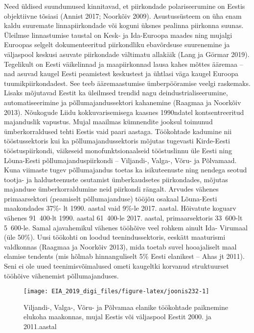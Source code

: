 \documentclass[]{book}
\begin{document}
Need üldised suundumused kinnitavad, et piirkondade polariseerumine on Eestis objektiivne tõsiasi (Annist
2017; Noorkõiv 2009). Asustussüsteem on üha enam kaldu suuremate linnapiirkondade või koguni üksnes
pealinna piirkonna suunas. Üleilmse linnastumise taustal on Kesk- ja Ida-Euroopa maades ning mujalgi
Euroopas selgelt dokumenteeritud piirkondliku ebavõrdsuse suurenemine ja väljaspool keskusi asuvate
piirkondade vältimatu allakäik (Lang ja Görmar 2019). Tegelikult on Eesti väikelinnad ja maapiirkonnad lausa
kahes mõttes ääremaa -- nad asuvad kaugel Eesti peamistest keskustest ja ühtlasi väga kaugel Euroopa
tuumikpiirkondadest. See teeb ääremaastumise ümberpööramise veelgi raskemaks.
Lisaks mõjutavad Eestit ka üleilmsed trendid nagu deindustrialiseerumine, automatiseerimine ja
põllumajandussektori kahanemine (Raagmaa ja Noorkõiv 2013). Nõukogude Liidu kokkuvarisemisega
kaasnes 1990ndatel kontsentreeritud majanduslik vapustus. Mujal maailmas kümnendite jooksul toimunud
ümberkorraldused tehti Eestis vaid paari aastaga. Töökohtade kadumine nii tööstussektoris kui ka
põllumajandussektoris mõjutas tugevasti Kirde-Eesti tööstuspiirkondi, väikeseid monofunktsionaalseid
tööstuslinnu üle Eesti ning Lõuna-Eesti põllumajanduspiirkondi -- Viljandi-, Valga-, Võru- ja Põlvamaad. Kuna
viimaste tugev põllumajandus toetas ka isikuteenuste ning nendega seotud tootja- ja haldusteenuste
osutamist ümberkaudsetes piirkondades, mõjutas majanduse ümberkorraldumine neid piirkondi rängalt.
Arvudes vähenes primaarsektori (peamiselt põllumajanduse) tööjõu osakaal Lõuna-Eesti maakondades 37\%-
lt 1990. aastal vaid 9\%-le 2017. aastal. Hõivatute koguarv vähenes 91~400-lt 1990. aastal 61~400-le 2017.
aastal, primaarsektoris 33~600-lt 5~600-le. Samal ajavahemikul vähenes tööhõive veel rohkem ainult Ida-
Virumaal (üle 50\%). Uusi töökohti on loodud teenindussektoris, eeskätt maaturismi valdkonnas (Raagmaa ja
Noorkõiv 2013), mida toetab suvel hooajaliselt maal elamise tendents (mis hõlmab hinnanguliselt 5\% Eesti
elanikest -- Ahas jt 2011). Seni ei ole uued teenimisvõimalused ometi kaugeltki korvanud struktuurset
tööhõive vähenemist põllumajanduses.

\begin{figure}

{\centering \texttt{[image: EIA\_2019\_digi\_files/figure-latex/joonis232-1]} 

}

\caption{Viljandi-, Valga-, Võru- ja Põlvamaa elanike töökohtade paiknemine elukoha maakonnas, mujal Eestis või väljaspool Eestit 2000. ja 2011.aastal}\label{fig:joonis232}
\end{figure}
\end{document}
